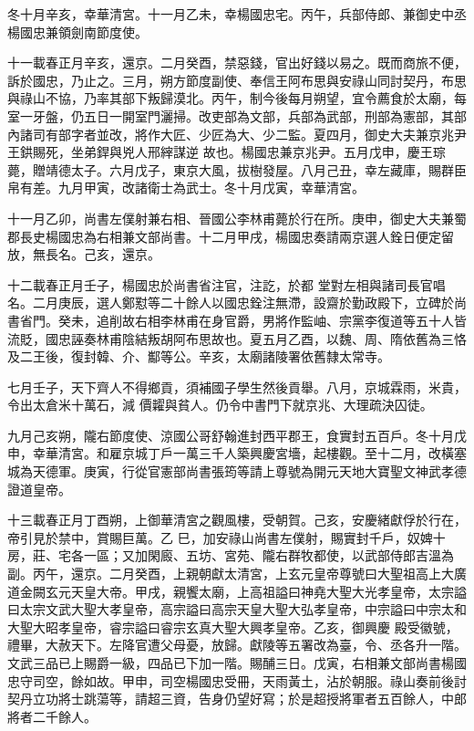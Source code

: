 \begin{pinyinscope}
 冬十月辛亥，幸華清宮。十一月乙未，幸楊國忠宅。丙午，兵部侍郎、兼御史中丞楊國忠兼領劍南節度使。



 十一載春正月辛亥，還京。二月癸酉，禁惡錢，官出好錢以易之。既而商旅不便，訴於國忠，乃止之。三月，朔方節度副使、奉信王阿布思與安祿山同討契丹，布思與祿山不協，乃率其部下叛歸漠北。丙午，制今後每月朔望，宜令薦食於太廟，每室一牙盤，仍五日一開室門灑掃。改吏部為文部，兵部為武部，刑部為憲部，其部內諸司有部字者並改，將作大匠、少匠為大、少二監。夏四月，御史大夫兼京兆尹王鉷賜死，坐弟銲與兇人邢縡謀逆
 故也。楊國忠兼京兆尹。五月戊申，慶王琮薨，贈靖德太子。六月戊子，東京大風，拔樹發屋。八月己丑，幸左藏庫，賜群臣帛有差。九月甲寅，改諸衛士為武士。冬十月戊寅，幸華清宮。



 十一月乙卯，尚書左僕射兼右相、晉國公李林甫薨於行在所。庚申，御史大夫兼蜀郡長史楊國忠為右相兼文部尚書。十二月甲戌，楊國忠奏請兩京選人銓日便定留放，無長名。己亥，還京。



 十二載春正月壬子，楊國忠於尚書省注官，注訖，於都
 堂對左相與諸司長官唱名。二月庚辰，選人鄭懟等二十餘人以國忠銓注無滯，設齋於勤政殿下，立碑於尚書省門。癸未，追削故右相李林甫在身官爵，男將作監岫、宗黨李復道等五十人皆流貶，國忠誣奏林甫陰結叛胡阿布思故也。夏五月乙酉，以魏、周、隋依舊為三恪及二王後，復封韓、介、酅等公。辛亥，太廟諸陵署依舊隸太常寺。



 七月壬子，天下齊人不得鄉貢，須補國子學生然後貢舉。八月，京城霖雨，米貴，令出太倉米十萬石，減
 價糶與貧人。仍令中書門下就京兆、大理疏決囚徒。



 九月己亥朔，隴右節度使、涼國公哥舒翰進封西平郡王，食實封五百戶。冬十月戊申，幸華清宮。和雇京城丁戶一萬三千人築興慶宮墻，起樓觀。至十二月，改橫塞城為天德軍。庚寅，行從官憲部尚書張筠等請上尊號為開元天地大寶聖文神武孝德證道皇帝。



 十三載春正月丁酉朔，上御華清宮之觀風樓，受朝賀。己亥，安慶緒獻俘於行在，帝引見於禁中，賞賜巨萬。乙
 巳，加安祿山尚書左僕射，賜實封千戶，奴婢十房，莊、宅各一區；又加閑廄、五坊、宮苑、隴右群牧都使，以武部侍郎吉溫為副。丙午，還京。二月癸酉，上親朝獻太清宮，上玄元皇帝尊號曰大聖祖高上大廣道金闕玄元天皇大帝。甲戌，親饗太廟，上高祖謚曰神堯大聖大光孝皇帝，太宗謚曰太宗文武大聖大孝皇帝，高宗謚曰高宗天皇大聖大弘孝皇帝，中宗謚曰中宗太和大聖大昭孝皇帝，睿宗謚曰睿宗玄真大聖大興孝皇帝。乙亥，御興慶
 殿受徽號，禮畢，大赦天下。左降官遭父母憂，放歸。獻陵等五署改為臺，令、丞各升一階。文武三品已上賜爵一級，四品已下加一階。賜酺三日。戊寅，右相兼文部尚書楊國忠守司空，餘如故。甲申，司空楊國忠受冊，天雨黃土，沾於朝服。祿山奏前後討契丹立功將士跳蕩等，請超三資，告身仍望好寫；於是超授將軍者五百餘人，中郎將者二千餘人。




\end{pinyinscope}
